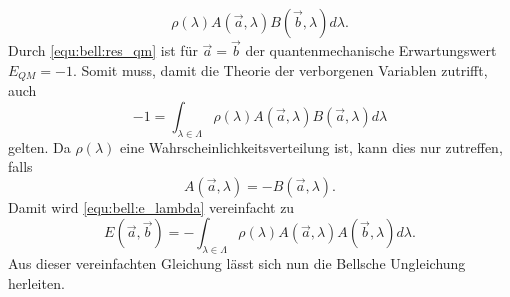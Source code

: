 \begin{refsection}
\begin{equation}
        \rho(\lambda) A(\vec{a},\lambda) B(\vec{b},\lambda) d\lambda.
\end{equation}
Durch \eqref{equ:bell:res_qm} ist f\"ur $\vec{a} = \vec{b}$ der 
quantenmechanische Erwartungswert $E_{QM} = -1$.
Somit muss, damit die Theorie der verborgenen Variablen zutrifft, auch
\[
    -1 = \int_{\lambda\in\Lambda} 
        \rho(\lambda) A(\vec{a},\lambda) B(\vec{a},\lambda) d\lambda
\]
gelten.
Da $\rho(\lambda)$ eine Wahrscheinlichkeitsverteilung ist, kann dies nur
zutreffen, falls
\begin{equation}\label{equ:bell:antikorrelation}
    A(\vec{a},\lambda) = -B(\vec{a},\lambda).
\end{equation}
Damit wird \eqref{equ:bell:e_lambda} vereinfacht zu
\begin{equation}\label{equ:bell:e_lambda_vereinf}
    E(\vec{a},\vec{b}) = -\int_{\lambda\in\Lambda} 
        \rho(\lambda) A(\vec{a},\lambda) A(\vec{b},\lambda) d\lambda.
\end{equation}
Aus dieser vereinfachten Gleichung l\"asst sich nun die Bellsche Ungleichung
herleiten.


\end{refsection}
